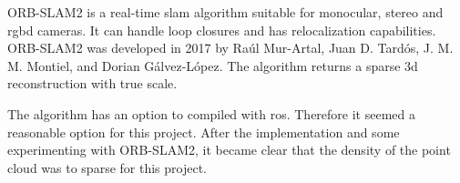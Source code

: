 ORB\hyp{}SLAM2 is a real\hyp{}time \acs{slam} algorithm suitable for monocular, stereo and \acs{rgbd} cameras. It can handle loop closures and has relocalization capabilities. ORB-SLAM2 was developed in 2017 by Ra\'ul Mur\hyp{}Artal, Juan D. Tard\'os, J. M. M. Montiel, and Dorian G\'alvez\hyp{}L\'opez. The algorithm returns a sparse \acs{3d} reconstruction with true scale. \cite{orb_slam2_github} \cite{mur_orb_slam_2}

The algorithm has an option to compiled with \acs{ros}. Therefore it seemed a reasonable option for this project. After the implementation and some experimenting with ORB\hyp{}SLAM2, it became clear that the density of the point cloud was to sparse for this project.